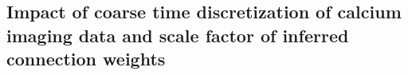 \subsection{Impact of coarse time discretization of calcium imaging data and scale factor of inferred connection weights} \label{sec:scale}


